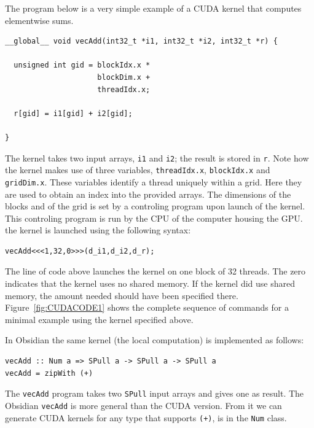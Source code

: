 \documentclass[a4paper]{book}
\begin{document}
The program below is a very simple example of a CUDA kernel that computes elementwise sums. 

\begin{small}
\begin{Verbatim}[samepage=true]
__global__ void vecAdd(int32_t *i1, int32_t *i2, int32_t *r) {
  
  unsigned int gid = blockIdx.x * 
                     blockDim.x + 
                     threadIdx.x;

  r[gid] = i1[gid] + i2[gid]; 

} 

\end{Verbatim}
\end{small}

\noindent The kernel takes two input arrays, {\tt i1} and {\tt i2}; the result is stored 
in {\tt r}. Note how the kernel makes use of three variables, {\tt threadIdx.x}, 
{\tt blockIdx.x} and {\tt gridDim.x}. These variables identify a thread uniquely within 
a grid. Here they are used to obtain an index into the provided arrays. The dimensions of 
the blocks and of the grid is set by a controling program upon launch of the kernel. This 
controling program is run by the CPU of the computer housing the GPU. the kernel is launched 
using the following syntax: 

\begin{small} 
\begin{Verbatim}[samepage=true]
vecAdd<<<1,32,0>>>(d_i1,d_i2,d_r);
\end{Verbatim}
\end{small}

\noindent The line of code above launches the kernel on one block of 32 threads. The zero 
indicates that the kernel uses no shared memory. If the kernel did use shared memory, the 
amount needed should have been specified there. Figure~\ref{fig:CUDACODE1} shows the complete 
sequence of commands for a minimal example using the kernel specified above. 

In Obsidian the same kernel (the local computation) is implemented as follows: 

\begin{small}
\begin{Verbatim}[samepage=true]
vecAdd :: Num a => SPull a -> SPull a -> SPull a
vecAdd = zipWith (+)
\end{Verbatim}
\end{small}

\noindent The {\tt vecAdd} program takes two {\tt SPull} input arrays and gives one 
as result. The Obsidian {\tt vecAdd} is more general than the CUDA version. From it 
we can generate CUDA kernels for any type that supports {\tt (+)}, is in the {\tt Num} class. 
\end{document}
